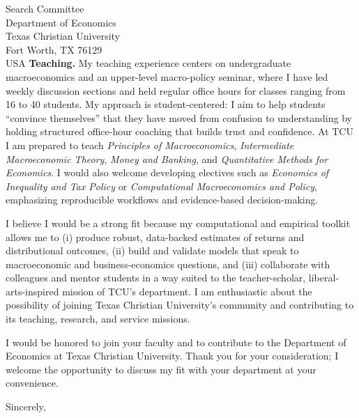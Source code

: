 \documentclass[11pt,letterpaper]{letter}
\begin{document}
\begin{letter}{Search Committee \\
Department of Economics \\
Texas Christian University \\
Fort Worth, TX 76129 \\ USA}
\textbf{Teaching.} My teaching experience centers on undergraduate macroeconomics and an upper-level macro-policy seminar, where I have led weekly discussion sections and held regular office hours for classes ranging from 16 to 40 students. My approach is student-centered: I aim to help students “convince themselves” that they have moved from confusion to understanding by holding structured office-hour coaching that builds trust and confidence. At TCU I am prepared to teach \textit{Principles of Macroeconomics}, \textit{Intermediate Macroeconomic Theory}, \textit{Money and Banking}, and \textit{Quantitative Methods for Economics}. I would also welcome developing electives such as \textit{Economics of Inequality and Tax Policy} or \textit{Computational Macroeconomics and Policy}, emphasizing reproducible workflows and evidence-based decision-making.

I believe I would be a strong fit because my computational and empirical toolkit allows me to (i) produce robust, data-backed estimates of returns and distributional outcomes, (ii) build and validate models that speak to macroeconomic and business-economics questions, and (iii) collaborate with colleagues and mentor students in a way suited to the teacher-scholar, liberal-arts-inspired mission of TCU’s department. I am enthusiastic about the possibility of joining Texas Christian University’s community and contributing to its teaching, research, and service missions.

I would be honored to join your faculty and to contribute to the Department of Economics at Texas Christian University. Thank you for your consideration; I welcome the opportunity to discuss my fit with your department at your convenience.

\closing{Sincerely,}

\end{letter}
\end{document}
